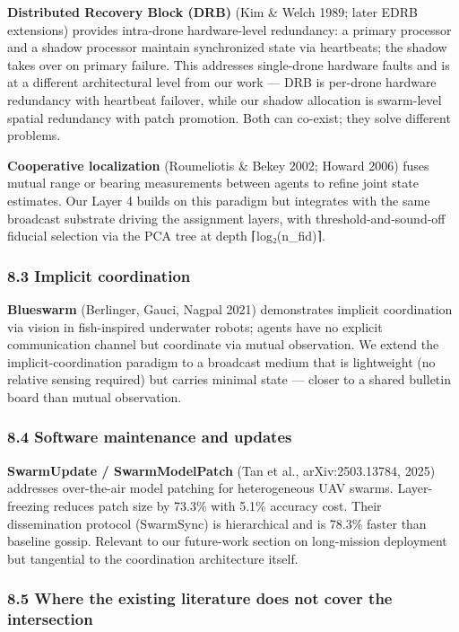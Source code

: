 \textbf{Distributed Recovery Block (DRB)} (Kim \& Welch 1989; later EDRB
extensions) provides intra-drone hardware-level redundancy: a primary
processor and a shadow processor maintain synchronized state via
heartbeats; the shadow takes over on primary failure. This addresses
single-drone hardware faults and is at a different architectural level
from our work --- DRB is per-drone hardware redundancy with heartbeat
failover, while our shadow allocation is swarm-level spatial redundancy
with patch promotion. Both can co-exist; they solve different problems.

\textbf{Cooperative localization} (Roumeliotis \& Bekey 2002; Howard
2006) fuses mutual range or bearing measurements between agents to
refine joint state estimates. Our Layer 4 builds on this paradigm but
integrates with the same broadcast substrate driving the assignment
layers, with threshold-and-sound-off fiducial selection via the PCA tree
at depth ⌈log₂(n\_fid)⌉.

\subsubsection{8.3 Implicit coordination}\label{implicit-coordination}

\textbf{Blueswarm} (Berlinger, Gauci, Nagpal 2021) demonstrates implicit
coordination via vision in fish-inspired underwater robots; agents have
no explicit communication channel but coordinate via mutual observation.
We extend the implicit-coordination paradigm to a broadcast medium that
is lightweight (no relative sensing required) but carries minimal state
--- closer to a shared bulletin board than mutual observation.

\subsubsection{8.4 Software maintenance and
updates}\label{software-maintenance-and-updates}

\textbf{SwarmUpdate / SwarmModelPatch} (Tan et al., arXiv:2503.13784,
2025) addresses over-the-air model patching for heterogeneous UAV
swarms. Layer-freezing reduces patch size by 73.3\% with 5.1\% accuracy
cost. Their dissemination protocol (SwarmSync) is hierarchical and is
78.3\% faster than baseline gossip. Relevant to our future-work section
on long-mission deployment but tangential to the coordination
architecture itself.

\subsubsection{8.5 Where the existing literature does not cover the
intersection}\label{where-the-existing-literature-does-not-cover-the-intersection}

